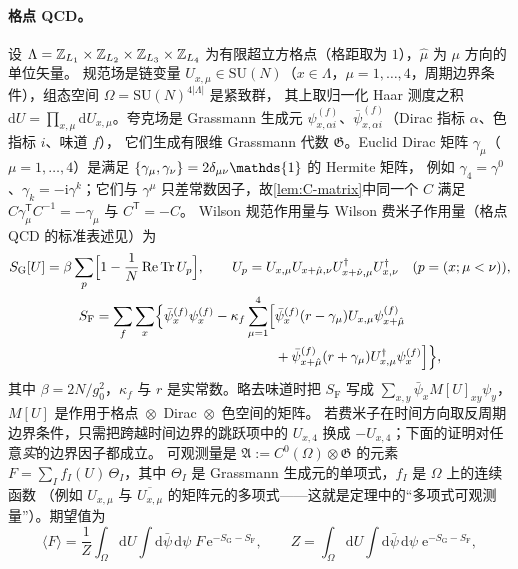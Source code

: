 \documentclass[UTF8,a4paper,11pt,fontset=fandol]{ctexart}
\let\amsmathbb\mathbb
\renewcommand{\mathbb}[1]{\ifx1#1\mathds{1}\else\amsmathbb{#1}\fi}
\theoremstyle{cplain}
\theoremstyle{cdefinition}
\theoremstyle{cremark}
\numberwithin{equation}{section}
\DeclareMathOperator{\Tr}{Tr}
\DeclareMathOperator{\Real}{Re}
\newcommand{\dd}{\mathrm{d}}                         %
\newcommand{\tp}{\mathsf{T}}                         %
\newcommand{\ii}{\mathrm{i}}                        %
\newcommand{\ee}{\mathrm{e}}                        %
\begin{document}
\paragraph{格点 QCD。}
设 $\Lambda=\mathbb Z_{L_1}\times\mathbb Z_{L_2}\times\mathbb Z_{L_3}\times\mathbb Z_{L_4}$ 为有限超立方格点（格距取为 $1$），$\hat\mu$ 为 $\mu$ 方向的单位矢量。
规范场是链变量 $U_{x,\mu}\in\mathrm{SU}(N)$（$x\in\Lambda$，$\mu=1,\dots,4$，周期边界条件），组态空间 $\Omega=\mathrm{SU}(N)^{4|\Lambda|}$ 是紧致群，
其上取归一化 Haar 测度之积 $\dd U=\prod_{x,\mu}\dd U_{x,\mu}$。夸克场是 Grassmann 生成元 $\psi^{(f)}_{x,\alpha i}$、$\bar\psi^{(f)}_{x,\alpha i}$（Dirac 指标 $\alpha$、色指标 $i$、味道 $f$），
它们生成有限维 Grassmann 代数 $\mathfrak G$。Euclid Dirac 矩阵 $\gamma_\mu$（$\mu=1,\dots,4$）是满足 $\{\gamma_\mu,\gamma_\nu\}=2\delta_{\mu\nu}\mathbb 1$ 的 Hermite 矩阵，
例如 $\gamma_4=\gamma^0$、$\gamma_k=-\ii\gamma^k$；它们与 $\gamma^\mu$ 只差常数因子，故\cref{lem:C-matrix}中同一个 $C$ 满足 $C\gamma_\mu^{\tp}C^{-1}=-\gamma_\mu$ 与 $C^{\tp}=-C$。
Wilson 规范作用量\cite{Wilson1974}与 Wilson 费米子作用量（格点 QCD 的标准表述见\cite{MontvayMunster1994,GattringerLang2010}）为
\begin{gather}
S_{\mathrm G}[U]=\beta\sum_{p}\Bigl[1-\frac1N\Real\Tr U_p\Bigr],\qquad U_p=U_{x,\mu}U_{x+\hat\mu,\nu}U^\dagger_{x+\hat\nu,\mu}U^\dagger_{x,\nu}\quad(p=(x;\mu<\nu)),\label{eq:np-SG}\\
\begin{split}
S_{\mathrm F}=\sum_f\sum_x\Bigl\{\bar\psi^{(f)}_x\psi^{(f)}_x-\kappa_f\sum_{\mu=1}^4\Bigl[&\bar\psi^{(f)}_x(r-\gamma_\mu)U_{x,\mu}\psi^{(f)}_{x+\hat\mu}\\
&+\bar\psi^{(f)}_{x+\hat\mu}(r+\gamma_\mu)U^\dagger_{x,\mu}\psi^{(f)}_x\Bigr]\Bigr\},
\end{split}\label{eq:np-SF}
\end{gather}
其中 $\beta=2N/g_0^2$，$\kappa_f$ 与 $r$ 是实常数。略去味道时把 $S_{\mathrm F}$ 写成 $\sum_{x,y}\bar\psi_xM[U]_{xy}\psi_y$，$M[U]$ 是作用于格点~$\otimes$~Dirac~$\otimes$~色空间的矩阵。
若费米子在时间方向取反周期边界条件，只需把跨越时间边界的跳跃项中的 $U_{x,4}$ 换成 $-U_{x,4}$；下面的证明对任意\emph{实}的边界因子都成立。
可观测量是 $\mathfrak A:=C^0(\Omega)\otimes\mathfrak G$ 的元素 $F=\sum_If_I(U)\,\Theta_I$，其中 $\Theta_I$ 是 Grassmann 生成元的单项式，$f_I$ 是 $\Omega$ 上的连续函数
（例如 $U_{x,\mu}$ 与 $\overline{U_{x,\mu}}$ 的矩阵元的多项式——这就是定理中的“多项式可观测量”）。期望值为
\begin{equation}\label{eq:np-expect}
\langle F\rangle=\frac1Z\int_\Omega\dd U\int\dd\bar\psi\,\dd\psi\;F\,\ee^{-S_{\mathrm G}-S_{\mathrm F}},\qquad Z=\int_\Omega\dd U\int\dd\bar\psi\,\dd\psi\;\ee^{-S_{\mathrm G}-S_{\mathrm F}},
\end{equation}
\end{document}
